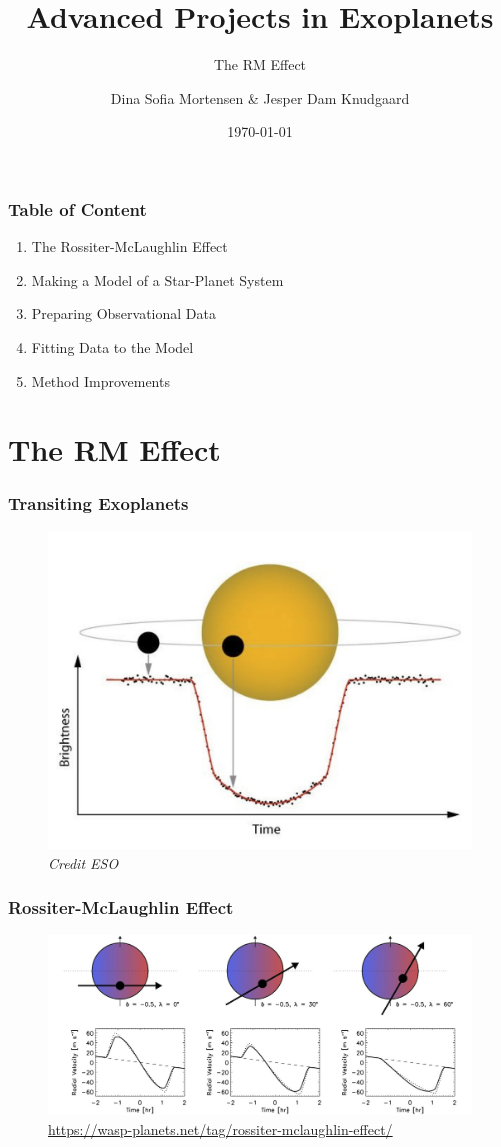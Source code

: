 \documentclass[show notes]{beamer}
\title{Advanced Projects in Exoplanets}
\subtitle{The RM Effect}
\author{Dina Sofia Mortensen \& Jesper Dam Knudgaard}
\institute{Stellar Astrophysics Centre, Aarhus University}
\date{\today}
\begin{document}
\begin{frame}
\titlepage
\end{frame}

\begin{frame}
\frametitle{Table of Content}
\begin{enumerate}
\item The Rossiter-McLaughlin Effect
\item Making a Model of a Star-Planet System
\item Preparing Observational Data
\item Fitting Data to the Model
\item Method Improvements
\end{enumerate}
\end{frame}

\section{The RM Effect}

\begin{frame}
\frametitle{Transiting Exoplanets}
	\begin{figure}
		\centering
		\includegraphics[width = 0.7\columnwidth]{../figures/Transit.jpg}
		\caption{\textit{Credit ESO}}
		\label{fig:transit} 
	\end{figure}
\end{frame}

\begin{frame}
\frametitle{Rossiter-McLaughlin Effect}
	\begin{figure}
		\centering
		\includegraphics[width=\textwidth]{../figures/winnwhites.jpg}
		\caption{\url{https://wasp-planets.net/tag/rossiter-mclaughlin-effect/}}
		\label{fig:rm_effect}
	\end{figure}
\end{frame}
\end{document}
